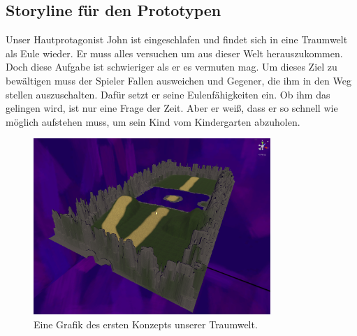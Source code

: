 \subsection{Storyline für den Prototypen}
Unser Hautprotagonist John ist eingeschlafen und findet sich in eine Traumwelt als Eule wieder. Er muss alles versuchen um aus dieser Welt herauszukommen. Doch diese Aufgabe ist schwieriger als er es vermuten mag. Um dieses Ziel zu bewältigen muss der Spieler Fallen ausweichen und Gegener, die ihm in den Weg stellen auszuschalten. Dafür setzt er seine Eulenfähigkeiten ein. Ob ihm das gelingen wird, ist nur eine Frage der Zeit. Aber er weiß, dass er so schnell wie möglich aufstehen muss, um sein Kind vom Kindergarten abzuholen.

\begin{figure}[H]
    \centering
    \includegraphics[width=0.8\textwidth]{chapters/15/images/Dreamworld.png}
    \caption{Eine Grafik des ersten Konzepts unserer Traumwelt.}
    \label{UST-7}
\end{figure}


